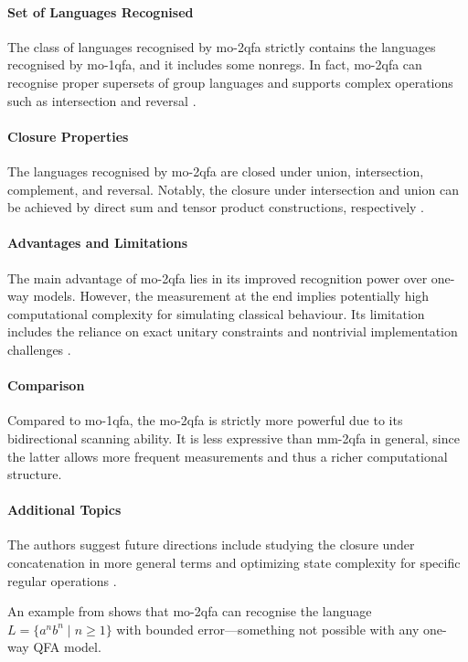\paragraph{Set of Languages Recognised} The class of languages recognised by \gls{mo-2qfa} strictly contains the languages recognised by \gls{mo-1qfa}, and it includes some non\glspl{reg}. In fact, \gls{mo-2qfa} can recognise proper supersets of group languages and supports complex operations such as intersection and reversal \cite{xi2008some}.

\paragraph{Closure Properties} The languages recognised by \gls{mo-2qfa} are closed under union, intersection, complement, and reversal. Notably, the closure under intersection and union can be achieved by direct sum and tensor product constructions, respectively \cite{xi2008some}.

\paragraph{Advantages and Limitations} The main advantage of \gls{mo-2qfa} lies in its improved recognition power over one-way models. However, the measurement at the end implies potentially high computational complexity for simulating classical behaviour. Its limitation includes the reliance on exact unitary constraints and nontrivial implementation challenges \cite{xi2008some}.

\paragraph{Comparison} Compared to \gls{mo-1qfa}, the \gls{mo-2qfa} is strictly more powerful due to its bidirectional scanning ability. It is less expressive than \gls{mm-2qfa} in general, since the latter allows more frequent measurements and thus a richer computational structure.

\paragraph{Additional Topics} The authors suggest future directions include studying the closure under concatenation in more general terms and optimizing state complexity for specific regular operations \cite{xi2008some}.

\begin{example}
An example from \cite{xi2008some} shows that \gls{mo-2qfa} can recognise the language $L = \{ a^nb^n \mid n \geq 1 \}$ with bounded error—something not possible with any one-way QFA model.
\end{example}

